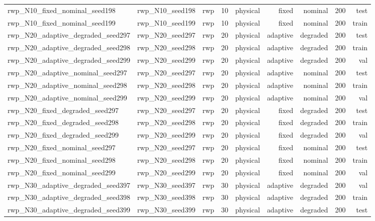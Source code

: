 \begin{tabular}{lrrrrrrrr}
rwp\_N10\_fixed\_nominal\_seed198 & rwp\_N10\_seed198 & rwp & 10 & physical & fixed & nominal & 200 & test \\
rwp\_N10\_fixed\_nominal\_seed199 & rwp\_N10\_seed199 & rwp & 10 & physical & fixed & nominal & 200 & train \\
rwp\_N20\_adaptive\_degraded\_seed297 & rwp\_N20\_seed297 & rwp & 20 & physical & adaptive & degraded & 200 & test \\
rwp\_N20\_adaptive\_degraded\_seed298 & rwp\_N20\_seed298 & rwp & 20 & physical & adaptive & degraded & 200 & train \\
rwp\_N20\_adaptive\_degraded\_seed299 & rwp\_N20\_seed299 & rwp & 20 & physical & adaptive & degraded & 200 & val \\
rwp\_N20\_adaptive\_nominal\_seed297 & rwp\_N20\_seed297 & rwp & 20 & physical & adaptive & nominal & 200 & test \\
rwp\_N20\_adaptive\_nominal\_seed298 & rwp\_N20\_seed298 & rwp & 20 & physical & adaptive & nominal & 200 & train \\
rwp\_N20\_adaptive\_nominal\_seed299 & rwp\_N20\_seed299 & rwp & 20 & physical & adaptive & nominal & 200 & val \\
rwp\_N20\_fixed\_degraded\_seed297 & rwp\_N20\_seed297 & rwp & 20 & physical & fixed & degraded & 200 & test \\
rwp\_N20\_fixed\_degraded\_seed298 & rwp\_N20\_seed298 & rwp & 20 & physical & fixed & degraded & 200 & train \\
rwp\_N20\_fixed\_degraded\_seed299 & rwp\_N20\_seed299 & rwp & 20 & physical & fixed & degraded & 200 & val \\
rwp\_N20\_fixed\_nominal\_seed297 & rwp\_N20\_seed297 & rwp & 20 & physical & fixed & nominal & 200 & test \\
rwp\_N20\_fixed\_nominal\_seed298 & rwp\_N20\_seed298 & rwp & 20 & physical & fixed & nominal & 200 & train \\
rwp\_N20\_fixed\_nominal\_seed299 & rwp\_N20\_seed299 & rwp & 20 & physical & fixed & nominal & 200 & val \\
rwp\_N30\_adaptive\_degraded\_seed397 & rwp\_N30\_seed397 & rwp & 30 & physical & adaptive & degraded & 200 & val \\
rwp\_N30\_adaptive\_degraded\_seed398 & rwp\_N30\_seed398 & rwp & 30 & physical & adaptive & degraded & 200 & train \\
rwp\_N30\_adaptive\_degraded\_seed399 & rwp\_N30\_seed399 & rwp & 30 & physical & adaptive & degraded & 200 & test \\

\end{tabular}
